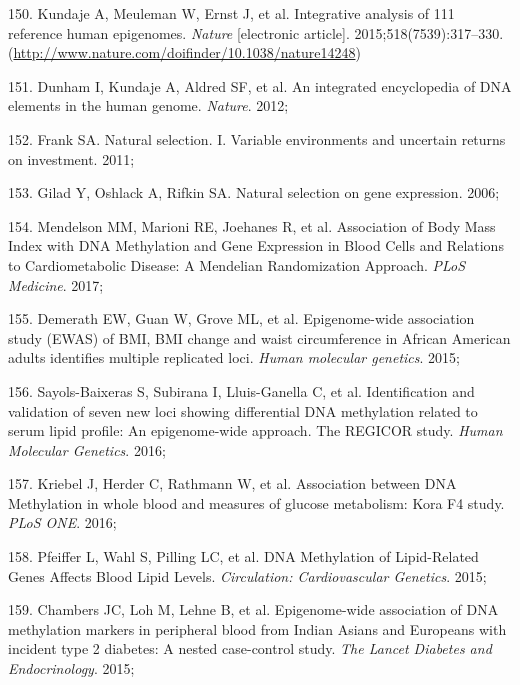 \documentclass[11pt,oneside]{bristolthesis}
\newenvironment{cslreferences}%
  {}%
  {\par}
\begin{document}
\begin{cslreferences}
\leavevmode\hypertarget{ref-Kundaje2015}{}%
150. Kundaje A, Meuleman W, Ernst J, et al. Integrative analysis of 111 reference human epigenomes. \emph{Nature} {[}electronic article{]}. 2015;518(7539):317--330. (\url{http://www.nature.com/doifinder/10.1038/nature14248})

\leavevmode\hypertarget{ref-Dunham2012}{}%
151. Dunham I, Kundaje A, Aldred SF, et al. An integrated encyclopedia of DNA elements in the human genome. \emph{Nature}. 2012;

\leavevmode\hypertarget{ref-Frank2011}{}%
152. Frank SA. Natural selection. I. Variable environments and uncertain returns on investment. 2011;

\leavevmode\hypertarget{ref-Gilad2006}{}%
153. Gilad Y, Oshlack A, Rifkin SA. Natural selection on gene expression. 2006;

\leavevmode\hypertarget{ref-Mendelson2017}{}%
154. Mendelson MM, Marioni RE, Joehanes R, et al. Association of Body Mass Index with DNA Methylation and Gene Expression in Blood Cells and Relations to Cardiometabolic Disease: A Mendelian Randomization Approach. \emph{PLoS Medicine}. 2017;

\leavevmode\hypertarget{ref-Demerath2015}{}%
155. Demerath EW, Guan W, Grove ML, et al. Epigenome-wide association study (EWAS) of BMI, BMI change and waist circumference in African American adults identifies multiple replicated loci. \emph{Human molecular genetics}. 2015;

\leavevmode\hypertarget{ref-Sayols-Baixeras2016}{}%
156. Sayols-Baixeras S, Subirana I, Lluis-Ganella C, et al. Identification and validation of seven new loci showing differential DNA methylation related to serum lipid profile: An epigenome-wide approach. The REGICOR study. \emph{Human Molecular Genetics}. 2016;

\leavevmode\hypertarget{ref-Kriebel2016}{}%
157. Kriebel J, Herder C, Rathmann W, et al. Association between DNA Methylation in whole blood and measures of glucose metabolism: Kora F4 study. \emph{PLoS ONE}. 2016;

\leavevmode\hypertarget{ref-Pfeiffer2015}{}%
158. Pfeiffer L, Wahl S, Pilling LC, et al. DNA Methylation of Lipid-Related Genes Affects Blood Lipid Levels. \emph{Circulation: Cardiovascular Genetics}. 2015;

\leavevmode\hypertarget{ref-Chambers2015}{}%
159. Chambers JC, Loh M, Lehne B, et al. Epigenome-wide association of DNA methylation markers in peripheral blood from Indian Asians and Europeans with incident type 2 diabetes: A nested case-control study. \emph{The Lancet Diabetes and Endocrinology}. 2015;


\end{cslreferences}
\end{document}

